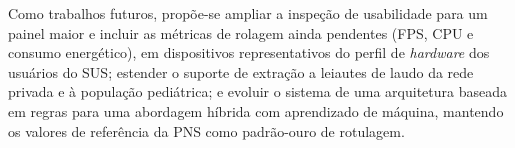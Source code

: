 Como trabalhos futuros, propõe-se ampliar a inspeção de usabilidade para um painel
maior e incluir as métricas de rolagem ainda pendentes (FPS, CPU e consumo
energético), em dispositivos representativos do perfil de \emph{hardware} dos
usuários do SUS; estender o suporte de extração a leiautes de laudo da rede privada
e à população pediátrica; e evoluir o sistema de uma arquitetura baseada em regras
para uma abordagem híbrida com aprendizado de máquina, mantendo os valores de
referência da PNS como padrão-ouro de rotulagem.
